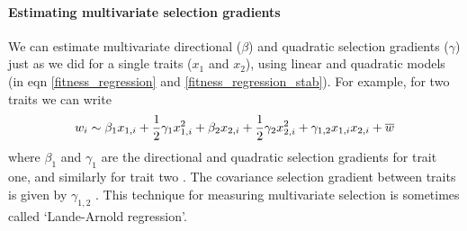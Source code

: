 

\paragraph{Estimating multivariate selection gradients}
We can estimate multivariate directional ($\beta$) and quadratic selection
gradients ($\gamma$) just as we did for a single traits ($x_1$ and $x_2$), using linear
and quadratic models (in eqn \eqref{fitness_regression} and \eqref{fitness_regression_stab}). For example, for two traits we can write
\begin{equation}
w_i \sim \beta_1 x_{1,i} + \frac{1}{2} \gamma_1 x_{1,i}^2 + \beta_2 x_{2,i} + \frac{1}{2} 
\gamma_2 x_{2,i}^2  + \gamma_{1,2} x_{1,i} x_{2,i}  + \overline{w} \label{fitness_regression_MV}
 \end{equation}
where $\beta_1$ and $\gamma_1$ are the directional and quadratic
selection gradients for trait one, and similarly for trait two \citep{lande1983measurement}. The
covariance selection gradient between traits is given by
$\gamma_{1,2}$ . This technique for measuring multivariate selection is
sometimes called `Lande-Arnold regression'.

